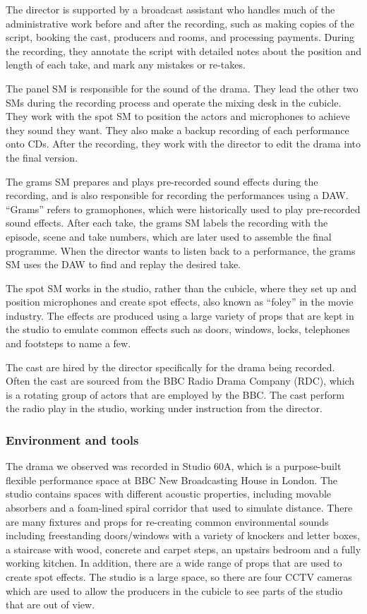 The director is supported by a broadcast assistant who handles much of the administrative work before and after the
recording, such as making copies of the script, booking the cast, producers and rooms, and processing payments.
During the recording, they annotate the script with detailed notes about the position and length of each take, and mark
any mistakes or re-takes.

The panel SM is responsible for the sound of the drama. They lead the other two SMs during the recording process and
operate the mixing desk in the cubicle. They work with the spot SM to position the actors and microphones to achieve
they sound they want. They also make a backup recording of each performance onto CDs. After the recording, they work
with the director to edit the drama into the final version.

The grams SM prepares and plays pre-recorded sound effects during the recording, and is also responsible for recording
the performances using a DAW.  ``Grams'' refers to gramophones, which were historically used to play pre-recorded sound
effects.  After each take, the grams SM labels the recording with the episode, scene and take numbers, which are later
used to assemble the final programme.  When the director wants to listen back to a performance, the grams SM uses the
DAW to find and replay the desired take.

The spot SM works in the studio, rather than the cubicle, where they set up and position microphones and create spot
effects, also known as ``foley'' in the movie industry. The effects are produced using a large variety of props that
are kept in the studio to emulate common effects such as doors, windows, locks, telephones and footsteps to name a few.

The cast are hired by the director specifically for the drama being recorded. Often the cast are sourced from the BBC
Radio Drama Company (RDC), which is a rotating group of actors that are employed by the BBC. The cast perform the
radio play in the studio, working under instruction from the director.

\subsubsection{Environment and tools}
The drama we observed was recorded in Studio 60A, which is a purpose-built flexible performance space at BBC New
Broadcasting House in London. The studio contains spaces with different acoustic properties, including movable
absorbers and a foam-lined spiral corridor that used to simulate distance. There are many fixtures and props for
re-creating common environmental sounds including freestanding doors/windows with a variety of knockers and letter
boxes, a staircase with wood, concrete and carpet steps, an upstairs bedroom and a fully working kitchen.  In addition,
there are a wide range of props that are used to create spot effects.  The studio is a large space, so there are four
CCTV cameras which are used to allow the producers in the cubicle to see parts of the studio that are out of view. 

